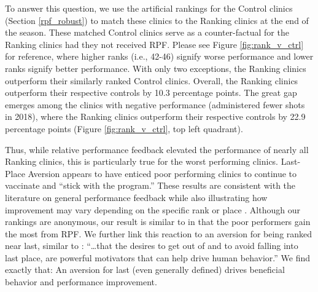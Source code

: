  To answer this question, we use the artificial rankings for the Control clinics (Section \ref{rpf_robust}) to match these clinics to the Ranking clinics at the end of the season. These matched Control clinics serve as a counter-factual for the Ranking clinics had they not received RPF. Please see Figure \ref{fig:rank_v_ctrl} for reference, where higher ranks (i.e., 42-46) signify worse performance and lower ranks signify better performance. With only two exceptions, the Ranking clinics outperform their similarly ranked Control clinics. Overall, the Ranking clinics outperform their respective controls by 10.3 percentage points. The great gap emerges among the clinics with negative performance (administered fewer shots in 2018), where the Ranking clinics outperform their respective controls by 22.9 percentage points (Figure \ref{fig:rank_v_ctrl}, top left quadrant).  
 
 Thus, while relative performance feedback elevated the performance of nearly all Ranking clinics, this is particularly true for the worst performing clinics. Last-Place Aversion appears to have enticed poor performing clinics to continue to vaccinate and “stick with the program.” These results are consistent with the literature on general performance feedback \citep[e.g.,][]{Kuhnen2012,Charness2014} while also illustrating how improvement may vary depending on the specific rank or place \citep{Gill2019}. Although our rankings are anonymous, our result is similar to \cite{Song2018a} in that the poor performers gain the most from RPF. We further link this reaction to an aversion for being ranked near last, similar to \cite[p. 35]{Buell2021}: “…that the desires to get out of and to avoid falling into last place, are powerful motivators that can help drive human behavior.” We find exactly that: An aversion for last (even generally defined) drives beneficial behavior and performance improvement.
 

